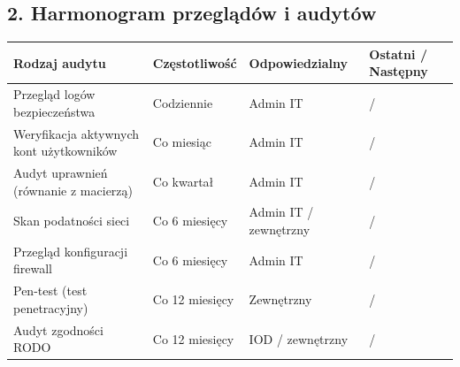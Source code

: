 \documentclass[12pt,a4paper]{article}
\begin{document}
\subsection{2. Harmonogram przeglądów i
audytów}\label{harmonogram-przeglux105duxf3w-i-audytuxf3w}

\begin{longtable}[]{@{}>{\raggedright\arraybackslash}p{}>{\raggedright\arraybackslash}p{}>{\raggedright\arraybackslash}p{}>{\raggedright\arraybackslash}p{}@{}}
\toprule\noalign{}
Rodzaj audytu & Częstotliwość & Odpowiedzialny & Ostatni / Następny \\
\midrule\noalign{}
\endhead
\bottomrule\noalign{}
\endlastfoot
Przegląd logów bezpieczeństwa & Codziennie & Admin IT & \underline{\hspace{2cm}} /
\underline{\hspace{2cm}} \\
Weryfikacja aktywnych kont użytkowników & Co miesiąc & Admin IT & \underline{\hspace{2cm}}
/ \underline{\hspace{2cm}} \\
Audyt uprawnień (równanie z macierzą) & Co kwartał & Admin IT & \underline{\hspace{2cm}} /
\underline{\hspace{2cm}} \\
Skan podatności sieci & Co 6 miesięcy & Admin IT / zewnętrzny & \underline{\hspace{2cm}} /
\underline{\hspace{2cm}} \\
Przegląd konfiguracji firewall & Co 6 miesięcy & Admin IT & \underline{\hspace{2cm}} /
\underline{\hspace{2cm}} \\
Pen-test (test penetracyjny) & Co 12 miesięcy & Zewnętrzny & \underline{\hspace{2cm}} /
\underline{\hspace{2cm}} \\
Audyt zgodności RODO & Co 12 miesięcy & IOD / zewnętrzny & \underline{\hspace{2cm}} /
\underline{\hspace{2cm}} \\
\end{longtable}
\end{document}
